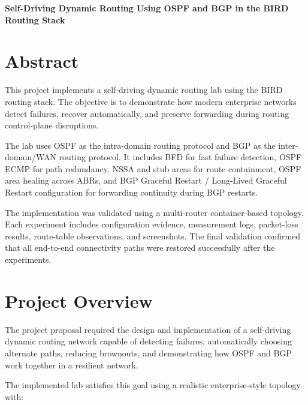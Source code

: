 \documentclass[12pt,a4paper]{article}
\begin{document}
\begin{titlepage}
\thispagestyle{empty}
\vspace*{\fill}
\begin{center}
{\Huge\bfseries Self-Driving Dynamic Routing Using OSPF and BGP in the BIRD Routing Stack\par}
\end{center}
\vspace*{\fill}
\end{titlepage}

\tableofcontents
\newpage

\section{Abstract}

This project implements a self-driving dynamic routing lab using the BIRD routing stack. The objective is to demonstrate how modern enterprise networks detect failures, recover automatically, and preserve forwarding during routing control-plane disruptions.

The lab uses OSPF as the intra-domain routing protocol and BGP as the inter-domain/WAN routing protocol. It includes BFD for fast failure detection, OSPF ECMP for path redundancy, NSSA and stub areas for route containment, OSPF area healing across ABRs, and BGP Graceful Restart / Long-Lived Graceful Restart configuration for forwarding continuity during BGP restarts.

The implementation was validated using a multi-router container-based topology. Each experiment includes configuration evidence, measurement logs, packet-loss results, route-table observations, and screenshots. The final validation confirmed that all end-to-end connectivity paths were restored successfully after the experiments.

\section{Project Overview}

The project proposal required the design and implementation of a self-driving dynamic routing network capable of detecting failures, automatically choosing alternate paths, reducing brownouts, and demonstrating how OSPF and BGP work together in a resilient network.

The implemented lab satisfies this goal using a realistic enterprise-style topology with:
\end{document}
